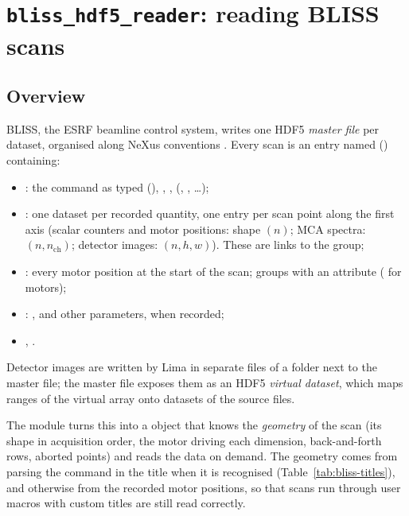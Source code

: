 \section{\texttt{bliss\_hdf5\_reader}: reading BLISS scans}\label{sec:bliss}

\subsection{Overview}

BLISS, the ESRF beamline control system, writes one HDF5 \emph{master file} per dataset,
organised along NeXus conventions \citep{Konnecke2015}. Every scan is an entry named
 () containing:
\begin{itemize}[nosep]
\item {}: the command as typed (),
  , ,  (, , \dots);
\item {}: one dataset per recorded quantity, one entry per scan point along
  the first axis (scalar counters and motor positions: shape $(n)$; MCA spectra:
  $(n, n_\mathrm{ch})$; detector images: $(n, h, w)$). These are links to the
   group;
\item {}: every motor position at the start of the scan;
   groups with an  attribute ( for motors);
\item {}: ,  and other parameters, when recorded;
\item {}, .
\end{itemize}
Detector images are written by Lima in separate files of a  folder next to the
master file; the master file exposes them as an HDF5 \emph{virtual dataset}, which maps
ranges of the virtual array onto datasets of the source files.

The module turns this into a  object that knows the \emph{geometry} of the scan
(its shape in acquisition order, the motor driving each dimension, back-and-forth rows,
aborted points) and reads the data on demand. The geometry comes from parsing the command in
the title when it is recognised (Table~\ref{tab:bliss-titles}), and otherwise from the
recorded motor positions, so that scans run through user macros with custom titles are
still read correctly.

